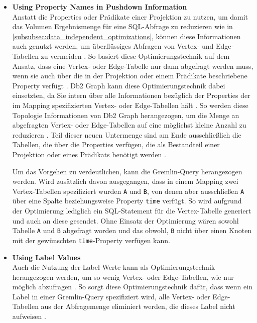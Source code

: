 \begin{itemize}
    \item \textbf{Using Property Names in Pushdown Information}\\
    Anstatt die Properties oder Prädikate einer Projektion zu nutzen, um damit das Volumen Ergebnismenge für eine SQL-Abfrage zu reduzieren wie in \autoref{subsubsec:data_independent_optimizations}, können diese Informationen auch genutzt werden, um überflüssiges Abfragen von Vertex- und Edge-Tabellen zu vermeiden \cite{sigmod_tian}. So basiert diese Optimierungstechnik auf dem Ansatz, dass eine Vertex- oder Edge-Tabelle nur dann abgefragt werden muss, wenn sie auch über die in der Projektion oder einem Prädikate beschriebene Property verfügt \cite{sigmod_tian}. Db2 Graph kann diese Optimierungstechnik dabei einsetzten, da Sie intern über alle Informationen bezüglich der Properties der im Mapping spezifizierten Vertex- oder Edge-Tabellen hält \cite{sigmod_tian}. So werden diese Topologie Informationen von Db2 Graph herangezogen, um die Menge an abgefragten Vertex- oder Edge-Tabellen auf eine möglichst kleine Anzahl zu reduzieren \cite{sigmod_tian}. Teil dieser neuen Untermenge sind am Ende ausschließlich die Tabellen, die über die Properties verfügen, die als Bestandteil einer Projektion oder eines Prädikats benötigt werden \cite{sigmod_tian}.

    Um das Vorgehen zu verdeutlichen, kann die Gremlin-Query  herangezogen werden. Wird zusätzlich davon ausgegangen, dass in einem Mapping zwei Vertex-Tabellen spezifiziert wurden \texttt{A} und \texttt{B}, von denen aber ausschließen \texttt{A} über eine Spalte beziehungsweise Property \texttt{time} verfügt. So wird aufgrund der Optimierung lediglich ein SQL-Statement für die Vertex-Tabelle generiert und auch an diese gesendet. Ohne Einsatz der Optimierung wären sowohl Tabelle \texttt{A} und \texttt{B} abgefragt worden und das obwohl, \texttt{B} nicht über einen Knoten mit der gewünschten \texttt{time}-Property verfügen kann.

    \item \textbf{Using Label Values}\\
    Auch die Nutzung der Label-Werte kann als Optimierungstechnik herangezogen werden, um so wenig Vertex- oder Edge-Tabellen, wie nur möglich abzufragen \cite{sigmod_tian}. So sorgt diese Optimierungstechnik dafür, dass wenn ein Label in einer Gremlin-Query spezifiziert wird, alle Vertex- oder Edge-Tabellen aus der Abfragemenge eliminiert werden, die dieses Label nicht aufweisen \cite{sigmod_tian}. 
    

\end{itemize}
